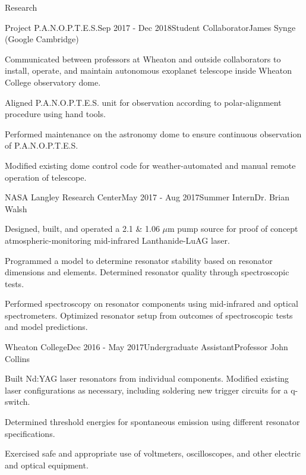 \documentclass{resume} %
\begin{document}
\begin{rSection}{Research}
\begin{rSubsection}{Project P.A.N.O.P.T.E.S.}{Sep 2017 - Dec 2018}{Student Collaborator}{James Synge (Google Cambridge)}
\item Communicated between professors at Wheaton and outside collaborators to install, operate, and maintain autonomous exoplanet telescope inside Wheaton College observatory dome.
\item Aligned P.A.N.O.P.T.E.S. unit for observation according to polar-alignment procedure using hand tools.
\item Performed maintenance on the astronomy dome to ensure continuous observation of P.A.N.O.P.T.E.S.
\item Modified existing dome control code for weather-automated and manual remote operation of telescope.
\end{rSubsection}
\begin{rSubsection}{NASA Langley Research Center}{May 2017 - Aug 2017}{Summer Intern}{Dr. Brian Walsh}
\item Designed, built, and operated a 2.1 \& 1.06 $\mu$m pump source for proof of concept atmospheric-monitoring mid-infrared Lanthanide-LuAG laser.
\item Programmed a model to determine resonator stability based on resonator dimensions and elements. Determined resonator quality through spectroscopic tests.
\item Performed spectroscopy on resonator components using mid-infrared and optical spectrometers. Optimized resonator setup from outcomes of spectroscopic tests and model predictions.
\end{rSubsection}

\begin{rSubsection}{Wheaton College}{Dec 2016 - May 2017}{Undergraduate Assistant}{Professor John Collins}
\item Built Nd:YAG laser resonators from individual components. Modified existing laser configurations as necessary, including soldering new trigger circuits for a q-switch.
\item  Determined threshold energies for spontaneous emission using different resonator specifications.
\item Exercised safe and appropriate use of voltmeters, oscilloscopes, and other electric and optical equipment.
\end{rSubsection}

\end{rSection}
\end{document}
